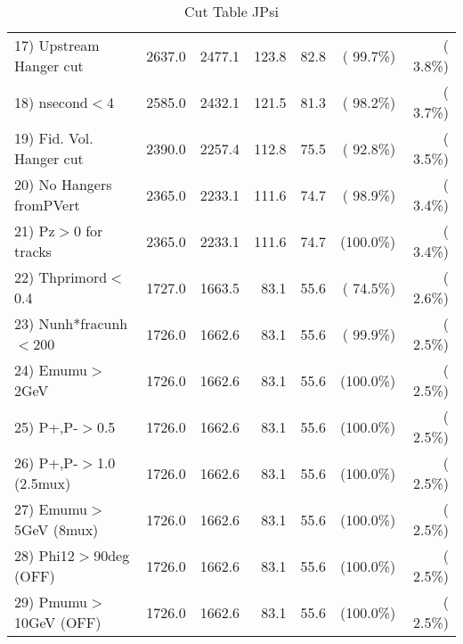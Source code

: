 \begin{table}[h!]
\begin{tabular}{||l||r|r|r|r|r|r||}
 17) Upstream Hanger cut  &       2637.0 &       2477.1 &        123.8 &         82.8 & ( 99.7\%) & (  3.8\%) \\
 18) nsecond$<$4          &       2585.0 &       2432.1 &        121.5 &         81.3 & ( 98.2\%) & (  3.7\%) \\
 19) Fid. Vol. Hanger cut &       2390.0 &       2257.4 &        112.8 &         75.5 & ( 92.8\%) & (  3.5\%) \\
 20) No Hangers fromPVert &       2365.0 &       2233.1 &        111.6 &         74.7 & ( 98.9\%) & (  3.4\%) \\
 21) Pz$>$0 for tracks    &       2365.0 &       2233.1 &        111.6 &         74.7 & (100.0\%) & (  3.4\%) \\
 22) Thprimord$<$0.4      &       1727.0 &       1663.5 &         83.1 &         55.6 & ( 74.5\%) & (  2.6\%) \\
 23) Nunh*fracunh$<$200   &       1726.0 &       1662.6 &         83.1 &         55.6 & ( 99.9\%) & (  2.5\%) \\
 24) Emumu$>$2GeV         &       1726.0 &       1662.6 &         83.1 &         55.6 & (100.0\%) & (  2.5\%) \\
 25) P+,P-$>$0.5          &       1726.0 &       1662.6 &         83.1 &         55.6 & (100.0\%) & (  2.5\%) \\
 26) P+,P-$>$1.0 (2.5mux) &       1726.0 &       1662.6 &         83.1 &         55.6 & (100.0\%) & (  2.5\%) \\
 27) Emumu$>$5GeV  (8mux) &       1726.0 &       1662.6 &         83.1 &         55.6 & (100.0\%) & (  2.5\%) \\
 28) Phi12$>$90deg  (OFF) &       1726.0 &       1662.6 &         83.1 &         55.6 & (100.0\%) & (  2.5\%) \\
 29) Pmumu$>$10GeV  (OFF) &       1726.0 &       1662.6 &         83.1 &         55.6 & (100.0\%) & (  2.5\%) \\
 \hline
 \hline
 \end{tabular}
 \caption{Cut Table  JPsi     }
 \label{tab-cutcohjpsi-mumu_cohrhop}
 \end{table}
